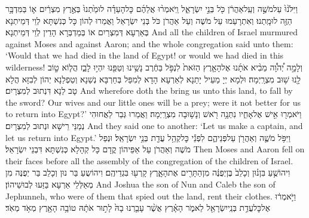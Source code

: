 {וַיִּלֹּ֙נוּ֙ עַל\maqqaf מֹשֶׁ֣ה וְעַֽל\maqqaf אַהֲרֹ֔ן כֹּ֖ל בְּנֵ֣י יִשְׂרָאֵ֑ל וַֽיֹּאמְר֨וּ אֲלֵהֶ֜ם כׇּל\maqqaf הָעֵדָ֗ה לוּ\maqqaf מַ֙תְנוּ֙ בְּאֶ֣רֶץ מִצְרַ֔יִם א֛וֹ בַּמִּדְבָּ֥ר הַזֶּ֖ה לוּ\maqqaf מָֽתְנוּ׃}
{וְאִתְרָעַמוּ עַל מֹשֶׁה וְעַל אַהֲרֹן כֹּל בְּנֵי יִשְׂרָאֵל וַאֲמַרוּ לְהוֹן כָּל כְּנִשְׁתָּא לְוֵי דְּמֵיתְנָא בְּאַרְעָא דְּמִצְרַיִם אוֹ בְּמַדְבְּרָא הָדֵין לְוֵי דְּמֵיתְנָא׃}
{And all the children of Israel murmured against Moses and against Aaron; and the whole congregation said unto them: ‘Would that we had died in the land of Egypt! or would we had died in this wilderness!}{}
{וְלָמָ֣ה יְ֠הֹוָ֠ה מֵבִ֨יא אֹתָ֜נוּ אֶל\maqqaf הָאָ֤רֶץ הַזֹּאת֙ לִנְפֹּ֣ל בַּחֶ֔רֶב נָשֵׁ֥ינוּ וְטַפֵּ֖נוּ יִהְי֣וּ לָבַ֑ז הֲל֧וֹא ט֦וֹב לָ֖נוּ שׁ֥וּב מִצְרָֽיְמָה׃}
{וּלְמָא יְיָ מַעֵיל יָתַנָא לְאַרְעָא הָדָא לְמִפַּל בְּחַרְבָּא נְשַׁנָא וְטַפְלַנָא יְהוֹן לְבִזָּא הֲלָא טָב לַנָא דִּנְתוּב לְמִצְרָיִם׃}
{And wherefore doth the \lord\space bring us unto this land, to fall by the sword? Our wives and our little ones will be a prey; were it not better for us to return into Egypt?’}{}
{וַיֹּאמְר֖וּ אִ֣ישׁ אֶל\maqqaf אָחִ֑יו נִתְּנָ֥ה רֹ֖אשׁ וְנָשׁ֥וּבָה מִצְרָֽיְמָה׃}
{וַאֲמַרוּ גְּבַר לַאֲחוּהִי נְמַנֵּי רֵישָׁא וּנְתוּב לְמִצְרָיִם׃}
{And they said one to another: ‘Let us make a captain, and let us return into Egypt.’}{}
{וַיִּפֹּ֥ל מֹשֶׁ֛ה וְאַהֲרֹ֖ן עַל\maqqaf פְּנֵיהֶ֑ם לִפְנֵ֕י כׇּל\maqqaf קְהַ֥ל עֲדַ֖ת בְּנֵ֥י יִשְׂרָאֵֽל׃}
{וּנְפַל מֹשֶׁה וְאַהֲרֹן עַל אַפֵּיהוֹן קֳדָם כָּל קְהָלָא כְּנִשְׁתָּא דִּבְנֵי יִשְׂרָאֵל׃}
{Then Moses and Aaron fell on their faces before all the assembly of the congregation of the children of Israel.}{}
{וִיהוֹשֻׁ֣עַ בִּן\maqqaf נ֗וּן וְכָלֵב֙ בֶּן\maqqaf יְפֻנֶּ֔ה מִן\maqqaf הַתָּרִ֖ים אֶת\maqqaf הָאָ֑רֶץ קָרְע֖וּ בִּגְדֵיהֶֽם׃}
{וִיהוֹשֻעַ בַּר נוּן וְכָלֵב בַּר יְפֻנֶּה מִן מְאַלְּלֵי אַרְעָא בַּזַּעוּ לְבוּשֵׁיהוֹן׃}
{And Joshua the son of Nun and Caleb the son of Jephunneh, who were of them that spied out the land, rent their clothes.}{}
{וַיֹּ֣אמְר֔וּ אֶל\maqqaf כׇּל\maqqaf עֲדַ֥ת בְּנֵֽי\maqqaf יִשְׂרָאֵ֖ל לֵאמֹ֑ר הָאָ֗רֶץ אֲשֶׁ֨ר עָבַ֤רְנוּ בָהּ֙ לָת֣וּר אֹתָ֔הּ טוֹבָ֥ה הָאָ֖רֶץ מְאֹ֥ד מְאֹֽד׃}
